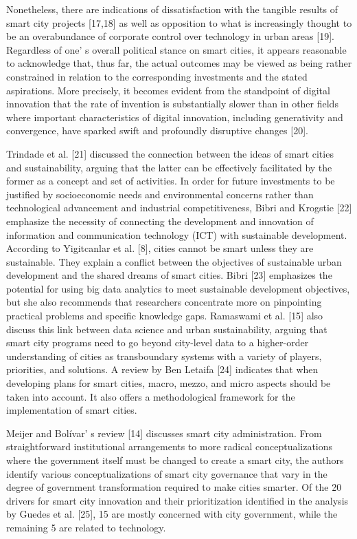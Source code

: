 \begin{multicols}{2}
Nonetheless, there are indications of dissatisfaction with the tangible
results of smart city projects {[}17,18{]} as well as opposition to what
is increasingly thought to be an overabundance of corporate control over
technology in urban areas {[}19{]}. Regardless of one' s
overall political stance on smart cities, it appears reasonable to
acknowledge that, thus far, the actual outcomes may be viewed as being
rather constrained in relation to the corresponding investments and the
stated aspirations. More precisely, it becomes evident from the
standpoint of digital innovation that the rate of invention is
substantially slower than in other fields where important
characteristics of digital innovation, including generativity and
convergence, have sparked swift and profoundly disruptive changes
{[}20{]}.

Trindade et al. {[}21{]} discussed the connection between the ideas of
smart cities and sustainability, arguing that the latter can be
effectively facilitated by the former as a concept and set of
activities. In order for future investments to be justified by
socioeconomic needs and environmental concerns rather than technological
advancement and industrial competitiveness, Bibri and Krogstie {[}22{]}
emphasize the necessity of connecting the development and innovation of
information and communication technology (ICT) with sustainable
development. According to Yigitcanlar et al. {[}8{]}, cities cannot be
smart unless they are sustainable. They explain a conflict between the
objectives of sustainable urban development and the shared dreams of
smart cities. Bibri {[}23{]} emphasizes the potential for using big data
analytics to meet sustainable development objectives, but she also
recommends that researchers concentrate more on pinpointing practical
problems and specific knowledge gaps. Ramaswami et al. {[}15{]} also
discuss this link between data science and urban sustainability, arguing
that smart city programs need to go beyond city-level data to a
higher-order understanding of cities as transboundary systems with a
variety of players, priorities, and solutions. A review by Ben Letaifa
{[}24{]} indicates that when developing plans for smart cities, macro,
mezzo, and micro aspects should be taken into account. It also offers a
methodological framework for the implementation of smart cities.

Meijer and Bolívar' s review {[}14{]} discusses smart
city administration. From straightforward institutional arrangements to
more radical conceptualizations where the government itself must be
changed to create a smart city, the authors identify various
conceptualizations of smart city governance that vary in the degree of
government transformation required to make cities smarter. Of the 20
drivers for smart city innovation and their prioritization identified in
the analysis by Guedes et al. {[}25{]}, 15 are mostly concerned with
city government, while the remaining 5 are related to technology.


\end{multicols}
